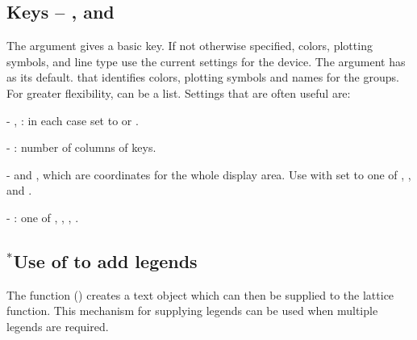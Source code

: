 \subsection{Keys -- ,  and }\label{sec:keys}

The argument  gives a basic key. If not otherwise
specified, colors, plotting symbols, and line type use the current
settings for the device.  The argument  has
 as its default. that identifies
colors, plotting symbols and names for the groups. For greater
flexibility,  can be a list.  Settings that are often
useful are:
\begin{itemizz}
\item[-] , : in each case set to 
or .
\item[-] : number of columns of keys.
\item[-]  and , which are coordinates for
  the whole display area.  Use with  set
  to one of ,
  ,  and .
\item[-] : one of , ,
, .
\end{itemizz}

\subsection*{$^*$Use of  to add legends}
The function  () creates a text object
which can then be supplied to the lattice function. This
mechanism for supplying legends can be used when multiple legends are
required.

